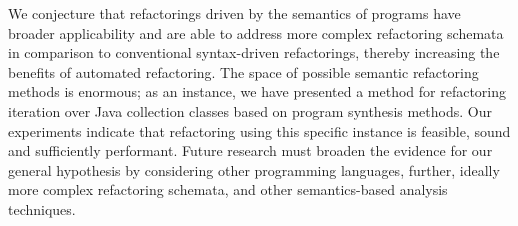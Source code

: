 \documentclass[runningheads,a4paper]{llncs}
\begin{document}
We conjecture that refactorings driven by the semantics of programs have
broader applicability and are able to address more complex refactoring
schemata in comparison to conventional syntax-driven refactorings, thereby
increasing the benefits of automated refactoring.  The space of possible
semantic refactoring methods is enormous; as an instance, we have presented
a method for refactoring iteration over Java collection classes based on
program synthesis methods.  Our experiments indicate that refactoring using
this specific instance is feasible, sound and sufficiently performant. 
Future research must broaden the evidence for our general hypothesis by
considering other programming languages, further, ideally more complex
refactoring schemata, and other semantics-based analysis techniques.




{}
\end{document}
